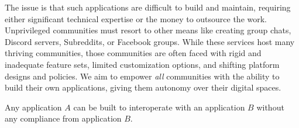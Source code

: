 The issue is that such applications are difficult to build and maintain,
requiring either significant technical expertise or the money to outsource the work.
Unprivileged communities must resort to other means like creating group chats,
Discord servers, Subreddits, or Facebook groups. %
While these services host many thriving communities,
those communities are often faced with rigid and inadequate feature sets,
limited customization options, and shifting platform designs and policies.
We aim to empower \emph{all} communities with the ability to
build their own applications, giving them autonomy over their digital spaces.








\begin{requirement}
\label{requirements:adversarial-interop}
Any application $A$ can be built to interoperate with an application $B$ without any compliance from application $B$.
\end{requirement}

